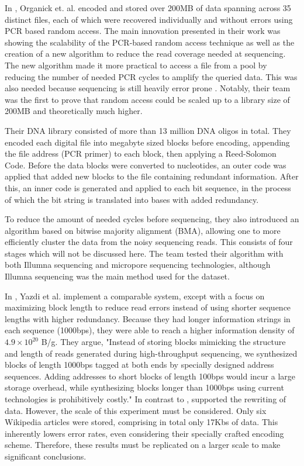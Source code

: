 \documentclass[a4paper,conference]{IEEEtran}
\begin{document}
In \cite{}, Organick et. al. encoded and stored over 200MB of data spanning across 35 distinct files, each of which were recovered individually and without errors using PCR based random access. The main innovation presented in their work was showing the scalability of the PCR-based random access technique as well as the creation of a new algorithm to reduce the read coverage needed at sequencing. The new algorithm made it more practical to access a file from a pool by reducing the number of needed PCR cycles to amplify the queried data. This was also needed because sequencing is still heavily error prone \cite{}. Notably, their team was the first to prove that random access could be scaled up to a library size of 200MB and theoretically much higher.

Their DNA library consisted of more than 13 million DNA oligos in total. They encoded each digital file into megabyte sized blocks before encoding, appending the file address (PCR primer) to each block, then applying a Reed-Solomon Code. Before the data blocks were converted to nucleotides, an outer code was applied that added new blocks to the file containing redundant information. After this, an inner code is generated and applied to each bit sequence, in the process of which the bit string is translated into bases with added redundancy. 

To reduce the amount of needed cycles before sequencing, they also introduced an algorithm based on bitwise majority alignment (BMA), allowing one to more efficiently cluster the data from the noisy sequencing reads. This consists of four stages which will not be discussed here. The team tested their algorithm with both Illumna sequencing and micropore sequencing technologies, although Illumna sequencing was the main method used for the dataset.

In \cite{}, Yazdi et al. implement a comparable system, except with a focus on maximizing block length to reduce read errors instead of using shorter sequence lengths with higher redundancy. Because they had longer information strings in each sequence (1000bps), they were able to reach a higher information density of $4.9 \times 10^{20}$ B/g. They argue, "Instead of storing blocks mimicking the structure and length of reads generated during high-throughput sequencing, we synthesized blocks of length 1000bps tagged at both ends by specially designed address sequences. Adding addresses to short blocks of length 100bps would incur a large storage overhead, while synthesizing blocks longer than 1000bps using current technologies is prohibitively costly." In contrast to \cite{}, \cite{} supported the rewriting of data. However, the scale of this experiment must be considered. Only six Wikipedia articles were stored, comprising in total only 17Kbs of data. This inherently lowers error rates, even considering their specially crafted encoding scheme. Therefore, these results must be replicated on a larger scale to make significant conclusions. 
\end{document}

